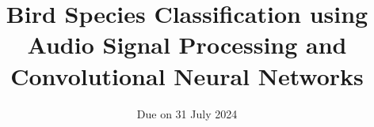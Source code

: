 

\subject{Project report - Machine learning lecture}
\title{Bird Species Classification using Audio Signal Processing and Convolutional Neural Networks}
\date{%
  Due on 31 July 2024
}



\maketitle
\thispagestyle{empty}
\tableofcontents
% 
\newpage








\renewcommand{\bibname}{References}
\printbibliography{}
%

\appendix
\newpage



